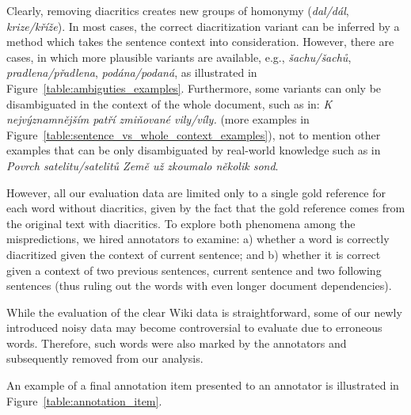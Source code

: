 \documentclass{pbmlarxiv}
\begin{document}
Clearly, removing diacritics creates new groups of homonymy (\textit{dal/dál}, \textit{krize/kříže}). In most cases, the correct diacritization variant can be inferred by a method which takes the sentence context into consideration. However, there are cases, in which more plausible variants are available, e.g., \textit{šachu/šachů}, \textit{pradlena/přadlena}, \textit{podána/podaná}, as illustrated in Figure~\ref{table:ambiguties_examples}. Furthermore, some variants can only be disambiguated in the context of the whole document, such as in: \textit{K nejvýznamnějším patří zmiňované vily/víly.} (more examples in Figure~\ref{table:sentence_vs_whole_context_examples}), not to mention other examples that can be only disambiguated by real-world knowledge such as in \textit{Povrch satelitu/satelitů Země už zkoumalo několik sond}.

However, all our evaluation data are limited only to a single gold reference for each word without diacritics, given by the fact that the gold reference comes from the original text with diacritics. To explore both phenomena among the mispredictions, we hired annotators to examine: a) whether a word is correctly diacritized given the context of current sentence; and b) whether it is correct given a context of two previous sentences, current sentence and two following sentences (thus ruling out the words with even longer document dependencies).

While the evaluation of the clear Wiki data \cite{naplava2018diacritics} is straightforward, some of our newly introduced noisy data may become controversial to evaluate due to erroneous words. Therefore, such words were also marked by the annotators and subsequently removed from our analysis.

An example of a final annotation item presented to an annotator is illustrated in Figure~\ref{table:annotation_item}.
\end{document}
